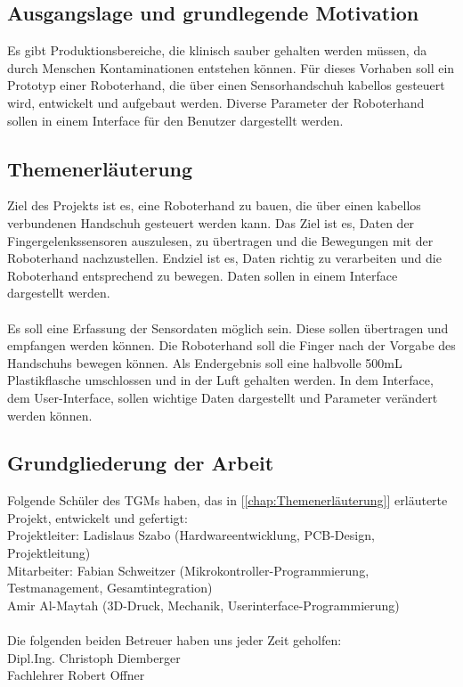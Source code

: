 \documentclass[titlepage,12pt,twoside]{article}
\begin{document}
\subsection{Ausgangslage und grundlegende Motivation}
\label{chap:Ausgangslage und grundlegende Motivation}
Es gibt Produktionsbereiche, die klinisch sauber gehalten werden müssen, da durch Menschen Kontaminationen entstehen
können. Für dieses Vorhaben soll ein Prototyp einer Roboterhand, die über einen Sensorhandschuh kabellos gesteuert wird,
entwickelt und aufgebaut werden. Diverse Parameter der Roboterhand sollen in einem Interface für den Benutzer 
dargestellt werden. \\

\subsection{Themenerläuterung}
\label{chap:Themenerläuterung}
Ziel des Projekts ist es, eine Roboterhand zu bauen, die über einen kabellos verbundenen
Handschuh gesteuert werden kann. Das Ziel ist es, Daten der Fingergelenkssensoren auszulesen,
zu übertragen und die Bewegungen mit der Roboterhand nachzustellen. Endziel ist es, Daten
richtig zu verarbeiten und die Roboterhand entsprechend zu bewegen. Daten sollen in einem
Interface dargestellt werden. \\
\\
Es soll eine Erfassung der Sensordaten möglich sein. Diese sollen übertragen und empfangen
werden können. Die Roboterhand soll die Finger nach der Vorgabe des Handschuhs bewegen
können. Als Endergebnis soll eine halbvolle 500mL Plastikflasche umschlossen und in der Luft
gehalten werden. In dem Interface, dem User-Interface, sollen wichtige Daten dargestellt und
Parameter verändert werden können. \\

\subsection{Grundgliederung der Arbeit}
\label{chap:Grundgliederung der Arbeit}
Folgende Schüler des TGMs haben, das in [\textcolor{blue}{\autoref{chap:Themenerläuterung}}] erläuterte Projekt, entwickelt und gefertigt: \hfill \break
\\
Projektleiter:    Ladislaus Szabo (Hardwareentwicklung, PCB-Design, Projektleitung)\\
Mitarbeiter: Fabian Schweitzer (Mikrokontroller-Programmierung, Testmanagement, Gesamtintegration)\\
Amir Al-Maytah (3D-Druck, Mechanik, Userinterface-Programmierung) 
\\
\\
Die folgenden beiden Betreuer haben uns jeder Zeit geholfen:
\\
Dipl.Ing. Christoph Diemberger \\
Fachlehrer Robert Offner
\end{document}
